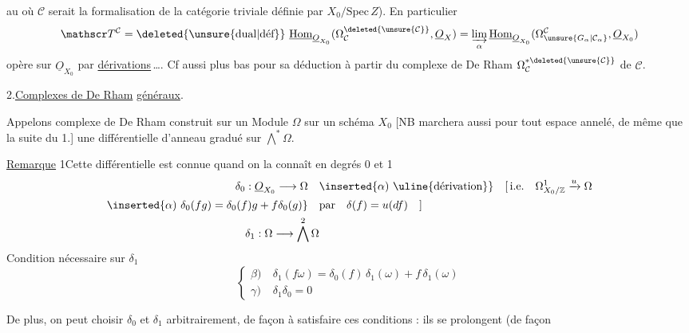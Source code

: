 au  où $\mathcal C$ serait la formalisation de la catégorie triviale définie par $X_0/\mathrm{Spec}\,Z$). En particulier
\[
\mathscr T^{\mathcal C}=\deleted{\unsure{\mathrm{dual}|\text{déf}}}\ \underline{\mathrm{Hom}}_{\underline O_{X_0}}(\Omega_{\mathcal C}^{\deleted{\unsure{\mathcal C}}},\underline O_X)=\varinjlim_{\alpha}\underline{\mathrm{Hom}}_{\underline O_{X_0}}(\Omega_{\unsure{G_\alpha|\mathcal C_\alpha}}^{\mathcal C},\underline O_{X_0})
\]
opère sur $\underline O_{X_0}$ par \uline{dérivations}\,\ldots. Cf aussi plus bas pour sa déduction à partir du complexe de De Rham $\Omega_{\mathcal C}^{*\deleted{\unsure{\mathcal C}}}$ de $\mathcal C$.

2.\quad \uline{Complexes de De Rham} \uline{généraux}.

Appelons complexe de De Rham construit sur un  Module  $\Omega$ sur un schéma $X_0$ [NB marchera aussi pour tout espace annelé, de même que la suite du 1.]  une  différentielle d'anneau gradué sur $\bigwedge^{*}\Omega$.

\uline{Remarque} 1\quad Cette différentielle est connue quand on la connaît en degrés 0 et 1
\[
\begin{aligned}
\delta_0:\underline O_{X_0}\longrightarrow\Omega\quad &\inserted{\alpha)\ \text{\uline{dérivation}}}\quad [\,\text{i.e.}\quad\Omega^1_{X_0/\mathbb Z}\xrightarrow{u}\Omega\\
\inserted{\alpha)\ \delta_0(fg)=\delta_0(f)g+f\delta_0(g)}\quad &\text{par}\quad\delta(f)=u(df)\quad ]\\
\delta_1:\Omega\longrightarrow\bigwedge^2\Omega &
\end{aligned}
\]
Condition nécessaire sur $\delta_1$
\[
\left\{\begin{aligned}
\beta)\ &\delta_1(f\omega)=\delta_0(f)\,\delta_1(\omega)+f\,\delta_1(\omega)\\
\gamma)\ &\delta_1\delta_0=0
\end{aligned}\right.
\]

De plus, on peut choisir $\delta_0$ et $\delta_1$ arbitrairement, de façon à satisfaire ces conditions : ils se prolongent (de façon


